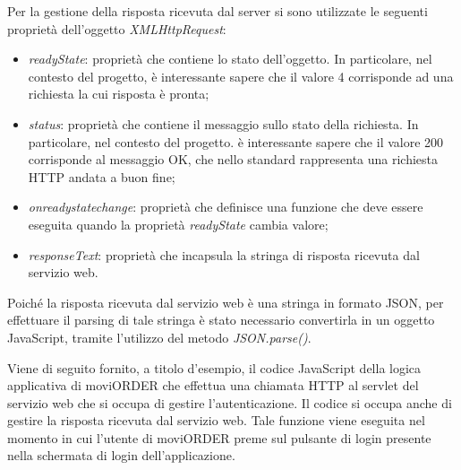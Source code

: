 Per la gestione della risposta ricevuta dal server si sono utilizzate le seguenti proprietà dell'oggetto \textit{XMLHttpRequest}:
\begin{itemize}
	\item \textit{readyState}: proprietà che contiene lo stato dell'oggetto. In particolare, nel contesto del progetto, è interessante sapere che il valore 4 corrisponde ad una richiesta la cui risposta è pronta;
	\item  \textit{status}: proprietà che contiene il messaggio sullo stato della richiesta. In particolare, nel contesto del progetto. è interessante sapere che il valore 200 corrisponde al messaggio OK, che nello standard rappresenta una richiesta HTTP andata a buon fine;
	\item \textit{onreadystatechange}: proprietà che definisce una funzione che deve essere eseguita quando la proprietà \textit{readyState} cambia valore;
	\item \textit{responseText}: proprietà che incapsula la stringa di risposta ricevuta dal servizio web. 
\end{itemize} 
Poiché la risposta ricevuta dal servizio web è una stringa in formato JSON, per effettuare il parsing di tale stringa è stato necessario convertirla in un oggetto JavaScript, tramite l'utilizzo del metodo \textit{JSON.parse()}.

Viene di seguito fornito, a titolo d'esempio, il codice JavaScript della logica applicativa di moviORDER che effettua una chiamata HTTP al servlet del servizio web che si occupa di gestire l'autenticazione. Il codice si occupa anche di gestire la risposta ricevuta dal servizio web. Tale funzione viene eseguita nel momento in cui l'utente di moviORDER preme sul pulsante di login presente nella schermata di login dell'applicazione.

\newpage


